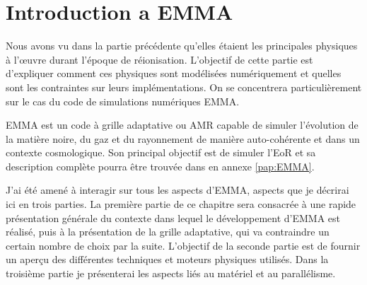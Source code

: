 \chapter{Introduction a EMMA}
\label{ch:introduction}


Nous avons vu dans la partie précédente qu'elles étaient les principales physiques à l’œuvre durant l'époque de réionisation.
L'objectif de cette partie est d'expliquer comment ces physiques sont modélisées numériquement et quelles sont les contraintes sur leurs implémentations.
On se concentrera particulièrement sur le cas du code de simulations numériques EMMA.

EMMA est un code à grille adaptative ou \ac{AMR} capable de simuler l'évolution de la matière noire, du gaz et du rayonnement de manière auto-cohérente et dans un contexte cosmologique.
Son principal objectif est de simuler l'\ac{EoR} et sa description complète pourra être trouvée dans \cite{aubert_emma:_2015} en annexe \ref{pap:EMMA}.

J'ai été amené à interagir sur tous les aspects d'EMMA, aspects que je décrirai ici en trois parties.
La première partie de ce chapitre sera consacrée à une rapide présentation générale du contexte dans lequel le développement d'EMMA est réalisé, puis à la présentation de la grille adaptative, qui va contraindre un certain nombre de choix par la suite.
L'objectif de la seconde partie est de fournir un aperçu des différentes techniques et moteurs physiques utilisés.%
Dans la troisième partie je présenterai les aspects liés au matériel et au parallélisme.


